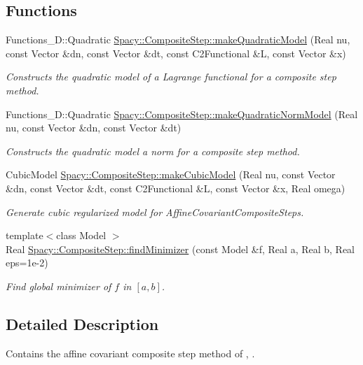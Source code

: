 \subsection*{Functions}
\begin{DoxyCompactItemize}
\item 
Functions\+\_\+D\+::\+Quadratic \hyperlink{group__CSGroup_gad4acace8423370ac1b3d53a03fbde523_gad4acace8423370ac1b3d53a03fbde523}{Spacy\+::\+Composite\+Step\+::make\+Quadratic\+Model} (Real nu, const Vector \&dn, const Vector \&dt, const C2\+Functional \&L, const Vector \&x)
\begin{DoxyCompactList}\small\item\em Constructs the quadratic model of a Lagrange functional for a composite step method. \end{DoxyCompactList}\item 
Functions\+\_\+D\+::\+Quadratic \hyperlink{group__CSGroup_ga2d9442c6e622766cb33dc14aa497c945_ga2d9442c6e622766cb33dc14aa497c945}{Spacy\+::\+Composite\+Step\+::make\+Quadratic\+Norm\+Model} (Real nu, const Vector \&dn, const Vector \&dt)
\begin{DoxyCompactList}\small\item\em Constructs the quadratic model a norm for a composite step method. \end{DoxyCompactList}\item 
Cubic\+Model \hyperlink{group__CSGroup_ga408c87c25b624012e03bca53e6ec3d10_ga408c87c25b624012e03bca53e6ec3d10}{Spacy\+::\+Composite\+Step\+::make\+Cubic\+Model} (Real nu, const Vector \&dn, const Vector \&dt, const C2\+Functional \&L, const Vector \&x, Real omega)
\begin{DoxyCompactList}\small\item\em Generate cubic regularized model for Affine\+Covariant\+Composite\+Steps. \end{DoxyCompactList}\item 
{\footnotesize template$<$class Model $>$ }\\Real \hyperlink{group__CSGroup_gadffb0e7fa07418c47de2474156d90a35_gadffb0e7fa07418c47de2474156d90a35}{Spacy\+::\+Composite\+Step\+::find\+Minimizer} (const Model \&f, Real a, Real b, Real eps=1e-\/2)
\begin{DoxyCompactList}\small\item\em Find global minimizer of $f$ in $[a,b]$. \end{DoxyCompactList}\end{DoxyCompactItemize}


\subsection{Detailed Description}
Contains the affine covariant composite step method of \cite{Lubkoll2015}, \cite{Lubkoll2015a}. 




